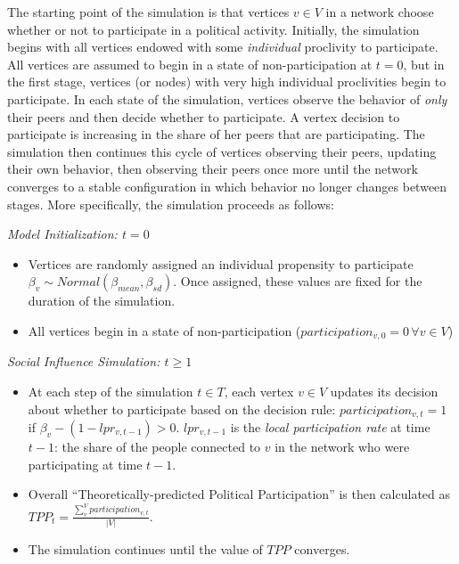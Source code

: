 \documentclass[12pt]{article}
\begin{document}
The starting point of the simulation is that vertices $v \in V$ in a network choose whether or not to participate in a political activity. Initially, the simulation begins with all vertices endowed with some {\it individual} proclivity to participate. All vertices are assumed to begin in a state of non-participation at $t=0$, but in the first stage, vertices (or nodes) with very high individual proclivities begin to participate. In each state of the simulation, vertices observe the behavior of {\it only} their peers and then decide whether to  participate. A vertex decision to participate is increasing in the share of her peers that are participating. %
The simulation then continues this cycle of vertices observing their peers, updating their own behavior, then observing their peers once more until the network converges to a stable configuration in which behavior no longer changes between stages. More specifically, the simulation proceeds as follows:

\emph{Model Initialization: $t=0$}
	 \begin{itemize}
 	  	\item Vertices are randomly assigned an individual propensity to participate $\beta_v\sim Normal(\beta_{mean}, \beta_{sd})$. Once assigned, these values are fixed for the duration of the simulation.
 		  \item All vertices begin in a state of non-participation ($participation_{v,0} = 0 \, \forall v \in V$)
	  \end{itemize}
\emph{Social Influence Simulation: $t\geq 1$}
	   \begin{itemize}
        \item At each step of the simulation $t \in T$, each vertex $v \in V$ updates its decision about whether to participate based on the decision rule:  $participation_{v,t} = 1$ if $\beta_v - (1-lpr_{v,t-1}) > 0$. $lpr_{v,t-1}$ is the \emph{local participation rate} at time $t-1$: the share of the people connected to $v$ in the network who were participating at time $t-1$.
        \item Overall ``Theoretically-predicted Political Participation'' is then calculated as $TPP_t = \frac{\sum_{v}^V participation_{v,t}}{|V|}$.
        \item The simulation continues until the value of $TPP$ converges.
    \end{itemize}
\end{document}
